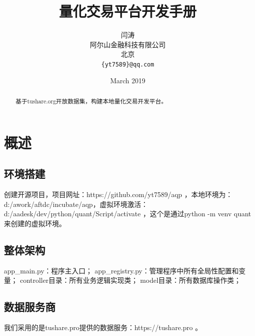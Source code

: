 \documentclass{article}
\title{量化交易平台开发手册}
\author{
  闫涛 \\
  阿尔山金融科技有限公司\\
  北京 \\
  \texttt{\{yt7589\}@qq.com} \\
}
\date{March 2019}
\begin{document}
\maketitle
\begin{abstract}
基于tushare.org开放数据集，构建本地量化交易开发平台。
\end{abstract}
\section{概述}
\subsection{环境搭建}
创建开源项目，项目网址：https://github.com/yt7589/aqp ，本地环境为：d:/awork/aftdc/incubate/aqp，虚拟环境激活：d:/aadesk/dev/python/quant/Script/activate ，这个是通过python -m venv quant来创建的虚拟环境。
\subsection{整体架构}
app\_main.py：程序主入口； \newline
app\_registry.py：管理程序中所有全局性配置和变量；\newline
controller目录：所有业务逻辑实现类；\newline
model目录：所有数据库操作类；\newline
\subsection{数据服务商}
我们采用的是tushare.pro提供的数据服务：https://tushare.pro 。
\end{document}
